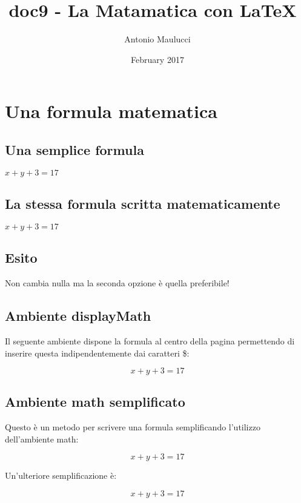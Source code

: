\documentclass{article}
\title{doc9 - La Matamatica con \LaTeX\ }
\author{Antonio Maulucci}
\date{February 2017}
\begin{document}
\maketitle

\section{Una formula matematica}
\subsection{Una semplice formula}

\( x+y+3=17 \)

\subsection{La stessa formula scritta matematicamente}

$ x + y +3 = 17 $ %

\subsection{Esito}

Non cambia nulla ma la seconda opzione è quella preferibile!

\subsection{Ambiente displayMath}


Il seguente ambiente dispone la formula al centro della pagina permettendo di inserire questa indipendentemente dai caratteri \$:

\begin{displaymath}
x + y + 3 = 17
\end{displaymath}

\subsection{Ambiente math semplificato}

Questo è un metodo per scrivere una formula semplificando l'utilizzo dell'ambiente math:

\[ x+ y +3 = 17 \]

Un'ulteriore semplificazione è:

$$x + y +3 = 17$$
\end{document}
